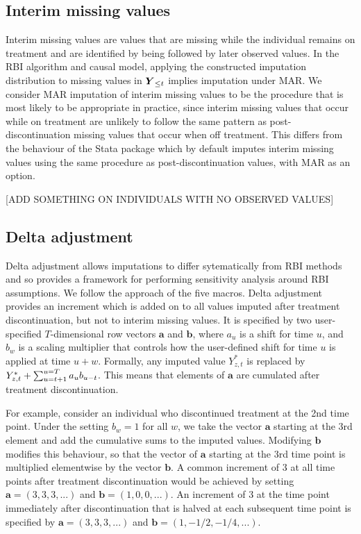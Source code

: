 \subsection{Interim missing values}

Interim missing values are values that are missing while the individual remains on treatment and are identified by being followed by later observed values. 
In the RBI algorithm and causal model, applying the constructed imputation distribution to missing values in $\boldsymbol{Y}_{{\le{t}}}$ implies imputation under MAR.
We consider MAR imputation of interim missing values to be the procedure that is most likely to be appropriate in practice, since interim missing values that occur while on treatment are unlikely to follow the same pattern as post-discontinuation missing values that occur when off treatment. 
This differs from the behaviour of the Stata package \citep{Cro++16} which by default imputes interim missing values using the same procedure as post-discontinuation values, with MAR as an option.

[ADD SOMETHING ON INDIVIDUALS WITH NO OBSERVED VALUES]

\subsection{Delta adjustment}

Delta adjustment allows imputations to differ sytematically from RBI methods and so provides a framework for performing sensitivity analysis around RBI assumptions.
We follow the approach of the five macros. 
Delta adjustment provides an increment which is added on to all values imputed after treatment discontinuation, but not to interim missing values. 
It is specified by two user-specified $T$-dimensional row vectors $\boldsymbol{a}$ and $\boldsymbol{b}$,
where $a_u$ is a shift for time $u$, 
and $b_w$ is a scaling multiplier that controls how the user-defined shift for time $u$ is applied at time $u+w$.
Formally, any imputed value $Y^*_{z,t}$ is replaced by $Y^*_{z,t} + \sum_{u=t+1}^{u=T} a_u b_{u-t}$.
This means that elements of $\boldsymbol{a}$  are cumulated after treatment discontinuation. 

For example, consider an individual who discontinued treatment at the 2nd time point. 
Under the setting $b_w=1$ for all $w$, we take the vector $\boldsymbol{a}$ starting at the 3rd element and add the cumulative sums to the imputed values. 
Modifying $\boldsymbol{b}$ modifies this behaviour, so that the vector of $\boldsymbol{a}$ starting at the 3rd time point is multiplied elementwise by the vector $\boldsymbol{b}$. 
A common increment of 3 at all time points after treatment discontinuation would be achieved by setting $\boldsymbol{a}=(3,3,3,...)$ and $\boldsymbol{b}=(1,0,0,...)$.
An increment of 3 at the time point immediately after discontinuation that is halved at each subsequent time point is specified by  
$\boldsymbol{a}=(3,3,3,...)$ and $\boldsymbol{b}=(1,-1/2,-1/4,...)$.

